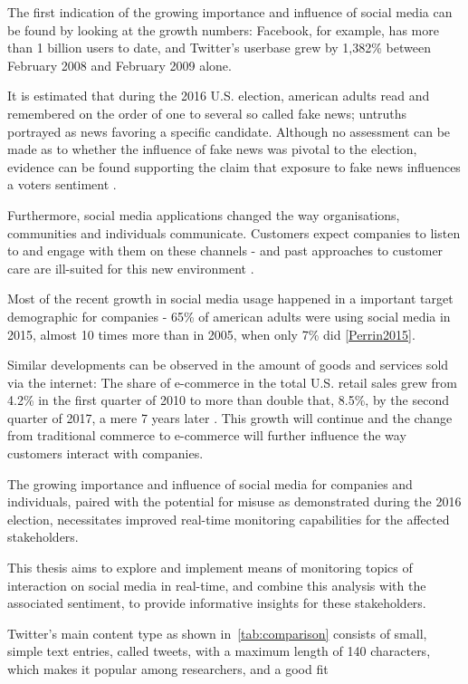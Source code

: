 The first indication of the growing importance and influence of social media can be found by looking at the growth numbers:
Facebook, for example, has more than 1 billion users to date, and Twitter's userbase grew by 1,382\% between February 2008 and February 2009 \cite{mcgiboney2009twitter} alone.
\par

It is estimated that during the 2016 U.S. election, american adults read and remembered on the order of one to several so called fake news;
untruths portrayed as news favoring a specific candidate.
Although no assessment can be made as to whether the influence of fake news was pivotal to the election,
evidence can be found supporting the claim that exposure to fake news influences a voters sentiment \cite{Allcott2017}.
\par
Furthermore, social media applications changed the way organisations, communities and individuals communicate.
Customers expect companies to listen to and engage with them on these channels - and past approaches to customer care are ill-suited for this new environment \cite{Kietzmann2011}.
\par
Most of the recent growth in social media usage happened in a important target demographic for companies -
65\% of american adults were using social media in 2015, almost 10 times more than in 2005, when only 7\% did \ref{Perrin2015}.
\par
Similar developments can be observed in the amount of goods and services sold via the internet:
The share of e-commerce in the total U.S. retail sales grew from 4.2\% in the first quarter of 2010 to more than double that, 8.5\%, by the second quarter of 2017, a mere 7 years later \cite{statistaECommerceGrowth}.
This growth will continue and the change from traditional commerce to e-commerce
will further influence the way customers interact with companies.
\par
The growing importance and influence of social media for companies and individuals,
paired with the potential for misuse as demonstrated during the 2016 election,
necessitates improved real-time monitoring capabilities for the affected stakeholders.
\par
This thesis aims to explore and implement means of monitoring topics of interaction on social media in real-time,
and combine this analysis with the associated sentiment, to provide informative insights for these stakeholders.

Twitter's main content type as shown in~\ref{tab:comparison} consists of small, simple text entries, called tweets, with a maximum length of 140 characters,
which makes it popular among researchers, and a good fit